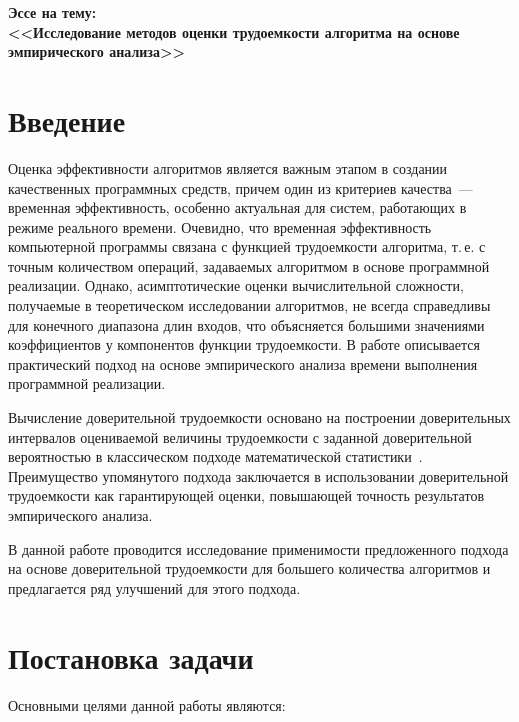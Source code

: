 \documentclass[a4paper, article, 12pt]{extarticle}
\begin{document}


\begin{center}
	\Large{\textbf{Эссе на тему:}}\\
	\Large{\textbf{<<Исследование методов оценки трудоемкости алгоритма на основе эмпирического анализа>>}}\\
	\hfill \break
\end{center}

\tableofcontents

\section{Введение}\label{sec:introduction}

Оценка эффективности алгоритмов является важным этапом в создании качественных программных средств, причем один из критериев качества~--- временная эффективность, особенно актуальная для систем, работающих в режиме реального времени. Очевидно, что временная эффективность компьютерной программы связана с функцией трудоемкости алгоритма, т.\,е. с точным количеством операций, задаваемых алгоритмом в основе программной реализации. Однако, асимптотические оценки вычислительной сложности, получаемые в теоретическом исследовании алгоритмов, не всегда справедливы для конечного диапазона длин входов, что объясняется большими значениями коэффициентов у компонентов функции трудоемкости. В работе описывается практический подход на основе эмпирического анализа времени выполнения программной реализации.

Вычисление доверительной трудоемкости основано на построении доверительных интервалов оцениваемой величины трудоемкости с заданной доверительной вероятностью в классическом подходе математической статистики~\cite{petrushyn_ulyanov_analysis}. Преимущество упомянутого подхода заключается в использовании доверительной трудоемкости как гарантирующей оценки, повышающей точность результатов эмпирического анализа.

В данной работе проводится исследование применимости предложенного подхода на основе доверительной трудоемкости для большего количества алгоритмов и предлагается ряд улучшений для этого подхода.

\section{Постановка задачи}\label{sec:problem_statement}

Основными целями данной работы являются:
\end{document}
